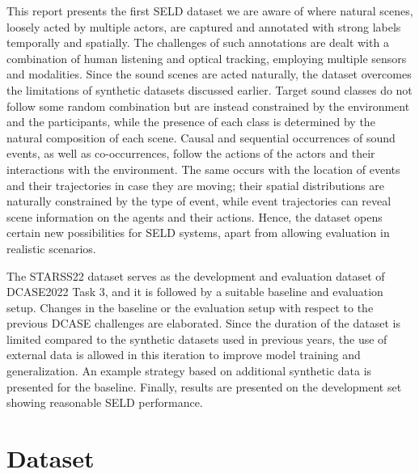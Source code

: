 \documentclass{article}
\begin{document}
\begin{sloppy}
This report presents the first SELD dataset we are aware of where natural scenes, loosely acted by multiple actors, are captured and annotated with strong labels temporally and spatially. The challenges of such annotations are dealt with a combination of human listening and optical tracking, employing multiple sensors and modalities. Since the sound scenes are acted naturally, the dataset overcomes the limitations of synthetic datasets discussed earlier. Target sound classes do not follow some random combination but are instead constrained by the environment and the participants, while the presence of each class is determined by the natural composition of each scene. Causal and sequential occurrences of sound events, as well as co-occurrences, follow the actions of the actors and their interactions with the environment. The same occurs with the location of events and their trajectories in case they are moving; their spatial distributions are naturally constrained by the type of event, while event trajectories can reveal scene information on the agents and their actions. Hence, the dataset opens certain new possibilities for SELD systems, apart from allowing evaluation in realistic scenarios. 

The STARSS22 dataset serves as the development and evaluation dataset of DCASE2022 Task 3, and it is followed by a suitable baseline and evaluation setup. Changes in the baseline or the evaluation setup with respect to the previous DCASE challenges are elaborated. Since the duration of the dataset is limited compared to the synthetic datasets used in previous years, the use of external data is allowed in this iteration to improve model training and generalization. An example strategy based on additional synthetic data is presented for the baseline. Finally, results are presented on the development set showing reasonable SELD performance.










\section{Dataset}
\label{sec:dataset}


\end{sloppy}
\end{document}
